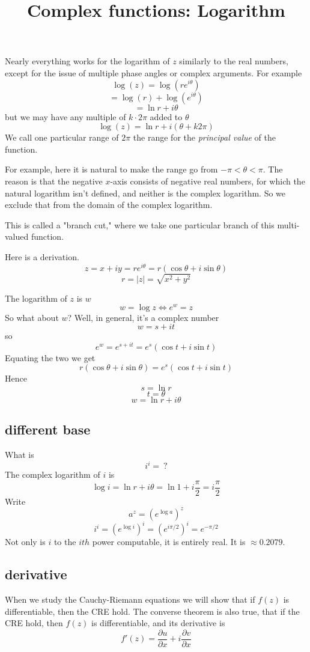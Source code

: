 \documentclass[11pt, oneside]{article}   	%
\title{Complex functions:  Logarithm}
\date{}							%
\begin{document}
\maketitle
\Large
Nearly everything works for the logarithm of $z$ similarly to the real numbers, except for the issue of multiple phase angles or complex arguments.  For example
\[ \log(z) = \log(re^{i\theta}) \]
\[ = \log(r) + \log(e^{i\theta}) \]
\[ = \ln r + i \theta \]
but we may have any multiple of $k \cdot 2 \pi$ added to $\theta$
\[ \log(z) = \ln r + i (\theta + k2 \pi) \]
We call one particular range of $2 \pi$ the range for the \emph{principal value} of the function.  

For example, here it is natural to make the range go from $-\pi < \theta < \pi$.  The reason is that the negative $x$-axis consists of negative real numbers, for which the natural logarithm isn't defined, and neither is the complex logarithm.  So we exclude that from the domain of the complex logarithm.  

This is called a "branch cut," where we take one particular branch of this multi-valued function.

Here is a derivation.  
\[ z = x + iy = re^{i\theta} = r(\cos \theta + i \sin \theta) \]
\[ r = |z| = \sqrt{x^2 + y^2} \]

The logarithm of $z$ is $w$
\[ w = \log z \iff e^w = z \]
So what about $w$? Well, in general, it's a complex number
\[ w = s + it \]
so
\[ e^w = e^{s + it} = e^s (\cos t + i \sin t) \]
Equating the two we get
\[ r (\cos \theta + i \sin \theta) = e^s (\cos t + i \sin t) \]
Hence
\[ s = \ln r \]
\[ t = \theta \]
\[ w = \ln r + i \theta \]
\subsection*{different base}
What is 
\[ i^i = \  ? \]
The complex logarithm of $i$ is
\[ \log i = \ln r + i \theta = \ln 1 + i \frac{\pi}{2} =  i \frac{\pi}{2} \]
 Write
\[ a^z = (e^{\log a})^z \]
\[ i^i = (e^{\log i})^i = (e^{i \pi/2})^i = e^{-\pi/2} \]
Not only is $i$ to the $ith$ power computable, it is entirely real.  It is $\approx 0.2079$.
\subsection*{derivative}
When we study the Cauchy-Riemann equations we will show that if $f(z)$ is differentiable, then the CRE hold.  The converse theorem is also true, that if the CRE hold, then $f(z)$ is differentiable, and its derivative is
\[ f'(z) = \frac{\partial u}{\partial x} + i \frac{\partial v}{\partial x} \]
\end{document}
